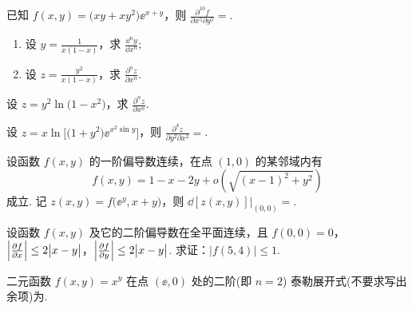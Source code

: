 	\begin{ti}
		已知 $f(x,y) = \bigl( xy + xy^{2} \bigr) \ee^{x + y}$，则 $\frac{\partial^{10}f}{\partial x^{5} \partial y^{5}} = $\htwo.
	\end{ti}

	\begin{ti}
		\begin{enumerate}
			\item 设 $y = \frac{1}{x(1 - x)}$，求 $\frac{\dd^{n}y}{\dd{x^{n}}}$;
			\item 设 $z = \frac{y^{2}}{x(1 - x)}$，求 $\frac{\partial^{n}z}{\partial x^{n}}$.
		\end{enumerate}
	\end{ti}

	\begin{ti}
		设 $z = y^{2} \ln \bigl( 1 - x^{2} \bigr)$，求 $\frac{\partial^{n}z}{\partial x^{n}}$.
	\end{ti}

	\begin{ti}
		设 $z = x \ln \bigl[ \bigl( 1 + y^{2} \bigr) \ee^{x^{2} \sin y} \bigr]$，则 $\frac{\partial^{4}z}{\partial y^{2} \partial x^{2}} = $\htwo.
	\end{ti}

	\begin{ti}
		设函数 $f(x,y)$ 的一阶偏导数连续，在点 $(1,0)$ 的某邻域内有
		\[
			f(x,y) = 1 - x - 2y + o\left( \sqrt{(x - 1)^{2} + y^{2}} \right)
		\]
		成立. 记 $z(x,y) = f\bigl( \ee^{y}, x + y \bigr)$，则 $\dd{[z(x,y)]}|_{(0,0)} = $\htwo.
	\end{ti}

	\begin{ti}
		设函数 $f(x,y)$ 及它的二阶偏导数在全平面连续，且 $f(0,0) = 0$，$\Bigl| \frac{\partial f}{\partial x} \Bigr| \leq 2 \bigl|x - y\bigr|$，$\Bigl| \frac{\partial f}{\partial y} \Bigr| \leq 2 \bigl|x - y\bigr|$. 求证：$\bigl|f(5,4)\bigr| \leq 1$.
	\end{ti}

	\begin{ti}
		二元函数 $f(x,y) = x^{y}$ 在点 $(\ee,0)$ 处的二阶(即 $n = 2$) 泰勒展开式(不要求写出余项)为\htwo.
	\end{ti}
